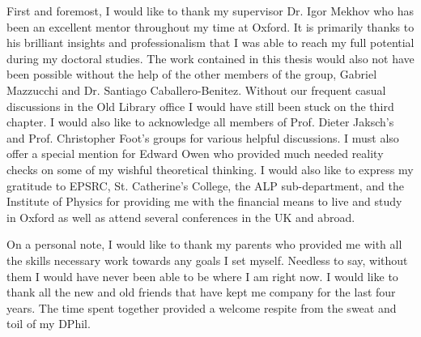 
\begin{acknowledgements}      

First and foremost, I would like to thank my supervisor Dr. Igor
Mekhov who has been an excellent mentor throughout my time at
Oxford. It is primarily thanks to his brilliant insights and
professionalism that I was able to reach my full potential during my
doctoral studies. The work contained in this thesis would also not
have been possible without the help of the other members of the group,
Gabriel Mazzucchi and Dr. Santiago Caballero-Benitez. Without our
frequent casual discussions in the Old Library office I would have
still been stuck on the third chapter. I would also like to
acknowledge all members of Prof. Dieter Jaksch's and Prof. Christopher
Foot's groups for various helpful discussions. I must also offer a
special mention for Edward Owen who provided much needed reality
checks on some of my wishful theoretical thinking. I would also like
to express my gratitude to EPSRC, St. Catherine's College, the ALP
sub-department, and the Institute of Physics for providing me with the
financial means to live and study in Oxford as well as attend several
conferences in the UK and abroad.

On a personal note, I would like to thank my parents who provided me
with all the skills necessary work towards any goals I set
myself. Needless to say, without them I would have never been able to
be where I am right now. I would like to thank all the new and old
friends that have kept me company for the last four years. The time
spent together provided a welcome respite from the sweat and toil of
my DPhil.

\vspace{2em}

\end{acknowledgements}
